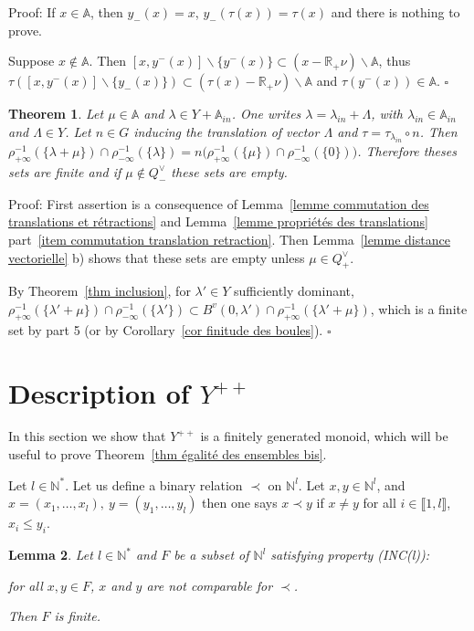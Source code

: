 \documentclass[12pt]{article}
\theoremstyle{plain}
\newtheorem{thm}{Theorem}[section] %
\newtheorem{lemme}[thm]{Lemma}
\theoremstyle{definition}
\newcommand{\R}{\mathbb{R}}
\newcommand{\A}{\mathbb{A}}
\newcommand{\N}{\mathbb{N}}
\newcommand{\Ne}{\mathbb{N}^*}
\begin{document}
Proof: If $x\in \mathbb{A}$, then $y_-(x)=x$, $y_-(\tau(x))=\tau(x)$ and there is nothing to prove. 

Suppose $x\notin \mathbb{A}$. 
Then $[x,y^-(x)]\backslash \{y^-(x)\}\subset (x-\R_+\nu)\backslash \mathbb{A}$,
 thus $\tau([x,y^-(x)]\backslash\{y_-(x)\})\subset (\tau(x)-\R_+\nu)\backslash \mathbb{A}$ and $\tau(y^-(x))\in \mathbb{A}$. $\square$
 




\begin{thm}\label{thm invariance des cardinaux}
Let $\mu\in \A$ and $\lambda\in Y+\A_{in}$. One writes $\lambda=\lambda_{in}+\Lambda$, with $\lambda_{in}\in\A_{in}$ and $\Lambda\in Y$. Let $n\in G$ inducing the translation of vector $\Lambda$ and $\tau=\tau_{\lambda_{in}}\circ n$. Then $\rho_{+\infty}^{-1}(\{\lambda+\mu\})\cap\rho_{-\infty}^{-1}(\{\lambda\})=n\big(\rho_{+\infty}^{-1}(\{\mu\})\cap\rho_{-\infty}^{-1}(\{0\})\big)$. Therefore theses sets are finite and if $\mu\notin Q^\vee_-$ these sets are empty.

\end{thm}

Proof: First assertion is a consequence of Lemma~\ref{lemme commutation des translations et rétractions} and Lemma~\ref{lemme propriétés des translations} part~\ref{item commutation translation retraction}. Then Lemma~\ref{lemme distance vectorielle} b) shows that these sets are empty unless $\mu\in Q^\vee_+$. 

By Theorem~\ref{thm inclusion}, for $\lambda'\in Y$ sufficiently dominant, $\rho_{+\infty}^{-1}(\{\lambda'+\mu\})\cap\rho_{-\infty}^{-1}(\{\lambda'\})\subset B^v(0,\lambda')\cap \rho_{+\infty}^{-1}(\{\lambda'+\mu\})$, which is a finite set by \cite{gaussent2014spherical} part 5 (or by Corollary~\ref{cor finitude des boules}). $\square$








\section{Description of $Y^{++}$}\label{sect Y^++}

In this section we show that $Y^{++}$ is a finitely generated monoid, which will be useful to prove Theorem~\ref{thm égalité des ensembles bis}.



Let $l\in \Ne$. Let us define a binary relation $\prec$ on $\N^l$. Let $x,y\in \N^l$,  and $x=(x_1,\ldots,x_l),\ y=(y_1,\ldots,y_l)$ then one says $x\prec y$ if $x\neq y$ 
 for all $i\in \llbracket 1,l\rrbracket$, $x_i\leq y_i$.
\begin{lemme}\label{lemme ensembles d'incomparables}
Let $l\in \Ne$ and $F$ be a subset of $\N^l$ satisfying property (INC(l)): 

for all $x,y\in F$, $x$ and $y$ are not comparable for $\prec$. 

 Then $F$ is finite.
\end{lemme}
\end{document}
